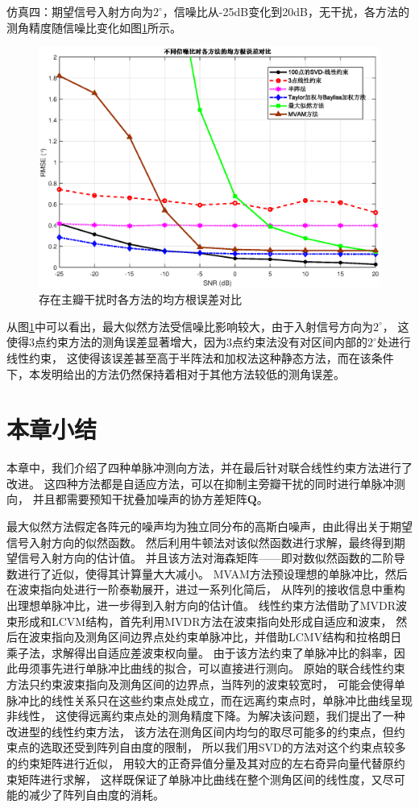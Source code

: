 \documentclass[master]{thesis-uestc}
\begin{document}
仿真四：期望信号入射方向为$2^\circ$，信噪比从-25dB变化到20dB，无干扰，各方法的测角精度随信噪比变化如图\ref{SVD-JLC_RMSE_SNR}所示。
\begin{figure}[H]
    \includegraphics[scale=0.5]{pic/SVD-JLC_RMSE_SNR.eps}
    \caption{存在主瓣干扰时各方法的均方根误差对比}
    \label{SVD-JLC_RMSE_SNR}
\end{figure}
从图\ref{SVD-JLC_RMSE_SNR}中可以看出，最大似然方法受信噪比影响较大，由于入射信号方向为$2^\circ$，
这使得3点约束方法的测角误差显著增大，因为3点约束法没有对区间内部的$2^\circ$处进行线性约束，
这使得该误差甚至高于半阵法和加权法这种静态方法，而在该条件下，本发明给出的方法仍然保持着相对于其他方法较低的测角误差。

\section{本章小结}
本章中，我们介绍了四种单脉冲测向方法，并在最后针对联合线性约束方法进行了改进。
这四种方法都是自适应方法，可以在抑制主旁瓣干扰的同时进行单脉冲测向，
并且都需要预知干扰叠加噪声的协方差矩阵$\bm{Q}$。

最大似然方法假定各阵元的噪声均为独立同分布的高斯白噪声，由此得出关于期望信号入射方向的似然函数。
然后利用牛顿法对该似然函数进行求解，最终得到期望信号入射方向的估计值。
并且该方法对海森矩阵——即对数似然函数的二阶导数进行了近似，使得其计算量大大减小。
MVAM方法预设理想的单脉冲比，然后在波束指向处进行一阶泰勒展开，进过一系列化简后，
从阵列的接收信息中重构出理想单脉冲比，进一步得到入射方向的估计值。
线性约束方法借助了MVDR波束形成和LCVM结构，首先利用MVDR方法在波束指向处形成自适应和波束，
然后在波束指向及测角区间边界点处约束单脉冲比，并借助LCMV结构和拉格朗日乘子法，求解得出自适应差波束权向量。
由于该方法约束了单脉冲比的斜率，因此毋须事先进行单脉冲比曲线的拟合，可以直接进行测向。
原始的联合线性约束方法只约束波束指向及测角区间的边界点，当阵列的波束较宽时，
可能会使得单脉冲比的线性关系只在这些约束点处成立，而在远离约束点时，单脉冲比曲线呈现非线性，
这使得远离约束点处的测角精度下降。为解决该问题，我们提出了一种改进型的线性约束方法，
该方法在测角区间内均匀的取尽可能多的约束点，但约束点的选取还受到阵列自由度的限制，
所以我们用SVD的方法对这个约束点较多的约束矩阵进行近似，
用较大的正奇异值分量及其对应的左右奇异向量代替原约束矩阵进行求解，
这样既保证了单脉冲比曲线在整个测角区间的线性度，又尽可能的减少了阵列自由度的消耗。
\end{document}
